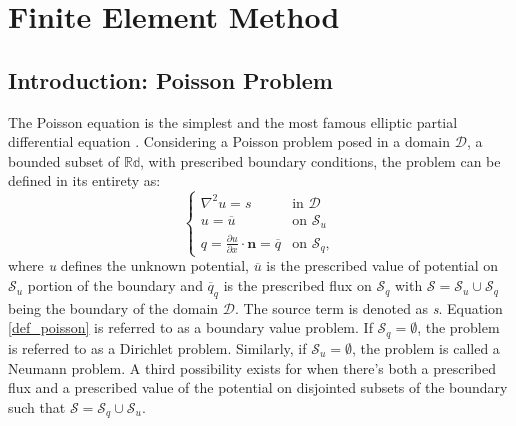 
\chapter{Finite Element Method} %

\label{Chapter2} %


\newtheorem{definition}{Definition}[section]

\section{Introduction: Poisson Problem} \label{sec:poisson_weak_form}
The Poisson equation is the simplest and the most famous elliptic partial differential equation \cite{arbenz2017}.
Considering a Poisson problem posed in a domain $\mathcal{D}$, a bounded subset of $\mathbb{Rd}$, with prescribed boundary conditions, the problem can be defined in its entirety as:
\begin{equation} \label{def_poisson}
    \begin{cases}
        \nabla ^{2}  u = s  & \text{in $\mathcal{D}$}\\
        u = \overline{u}  & \text{on $\mathcal{S}_{u}$}\\
        q = \frac{\partial u}{\partial x} \cdot \boldsymbol{n} = \overline{q} & \text{on $\mathcal{S}_{q}$},
    \end{cases}
\end{equation}
where \emph{u} defines the unknown potential, $\overline{u}$ is the prescribed value of potential on $\mathcal{S}_{u}$ portion of the boundary and $\overline{q}_{q}$ is the prescribed flux on $\mathcal{S}_{q}$
 with $\mathcal{S} = \mathcal{S}_{u} \cup \mathcal{S}_{q}$ being the boundary of the domain $\mathcal{D}$. The source term is denoted as \emph{s}.
 Equation \eqref{def_poisson} is referred to as a boundary value problem. If $\mathcal{S}_{q} = \emptyset$, the problem is referred to as a Dirichlet problem.
 Similarly, if $\mathcal{S}_{u} = \emptyset$, the problem is called a Neumann problem.
 A third possibility exists for when there's both a prescribed flux and a prescribed value of the potential on disjointed subsets of the boundary such that $\mathcal{S} = \mathcal{S}_{q} \cup \mathcal{S}_{u}$.

